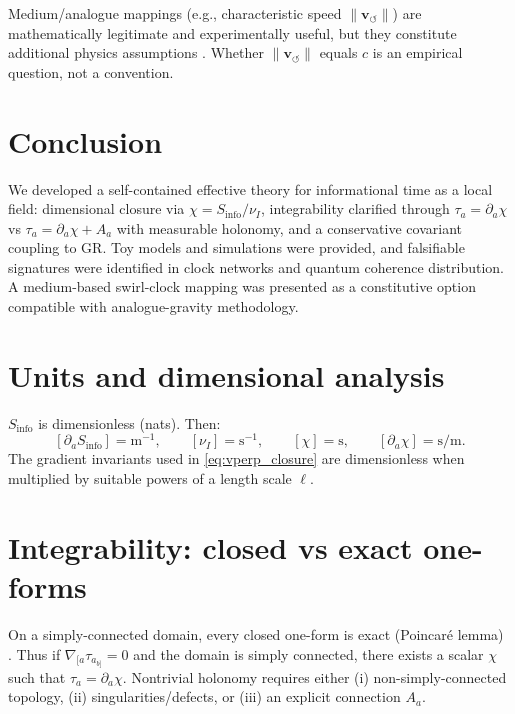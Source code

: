 \documentclass[11pt]{article}
\newcommand{\vswirl}{\mathbf{v}_{\!\boldsymbol{\circlearrowleft}}} %
\newcommand{\vnorm}{\lVert \vswirl \rVert}
\newcommand{\Sinfo}{S_{\mathrm{info}}}
\newcommand{\tua}{\tau_a}
\begin{document}
    Medium/analogue mappings (e.g., characteristic speed $\vnorm$) are mathematically legitimate and experimentally useful, but they constitute additional physics assumptions \cite{Unruh1981_SonicBH,Visser1998_Acoustic}. Whether $\vnorm$ equals $c$ is an empirical question, not a convention.

    \section{Conclusion}
    We developed a self-contained effective theory for informational time as a local field: dimensional closure via $\chi=\Sinfo/\nu_I$, integrability clarified through $\tua=\partial_a\chi$ vs $\tua=\partial_a\chi+A_a$ with measurable holonomy, and a conservative covariant coupling to GR. Toy models and simulations were provided, and falsifiable signatures were identified in clock networks and quantum coherence distribution. A medium-based swirl-clock mapping was presented as a constitutive option compatible with analogue-gravity methodology.

    \appendix
    \section{Units and dimensional analysis}
    $\Sinfo$ is dimensionless (nats). Then:
    \[
        [\partial_a \Sinfo]=\mathrm{m}^{-1},\qquad
        [\nu_I]=\mathrm{s}^{-1},\qquad
        [\chi]=\mathrm{s},\qquad
        [\partial_a\chi]=\mathrm{s/m}.
    \]
    The gradient invariants used in \eqref{eq:vperp_closure} are dimensionless when multiplied by suitable powers of a length scale $\ell$.

    \section{Integrability: closed vs exact one-forms}
    On a simply-connected domain, every closed one-form is exact (Poincar\'e lemma) \cite{BottTu1982_DiffForms,Frankel2011_GeometryPhysics}. Thus if $\nabla_{[a}\tua_{b]}=0$ and the domain is simply connected, there exists a scalar $\chi$ such that $\tua=\partial_a\chi$. Nontrivial holonomy requires either (i) non-simply-connected topology, (ii) singularities/defects, or (iii) an explicit connection $A_a$.
\end{document}
